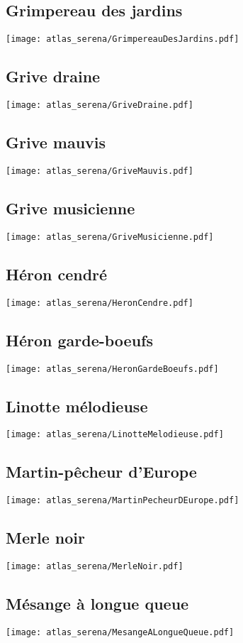 \subsection{Grimpereau des jardins}
\texttt{[image: atlas\_serena/GrimpereauDesJardins.pdf]}
\subsection{Grive draine}
\texttt{[image: atlas\_serena/GriveDraine.pdf]}
\subsection{Grive mauvis}
\texttt{[image: atlas\_serena/GriveMauvis.pdf]}
\subsection{Grive musicienne}
\texttt{[image: atlas\_serena/GriveMusicienne.pdf]}
\subsection{Héron cendré}
\texttt{[image: atlas\_serena/HeronCendre.pdf]}
\subsection{Héron garde-boeufs}
\texttt{[image: atlas\_serena/HeronGardeBoeufs.pdf]}
\subsection{Linotte mélodieuse}
\texttt{[image: atlas\_serena/LinotteMelodieuse.pdf]}
\subsection{Martin-pêcheur d'Europe}
\texttt{[image: atlas\_serena/MartinPecheurDEurope.pdf]}
\subsection{Merle noir}
\texttt{[image: atlas\_serena/MerleNoir.pdf]}
\subsection{Mésange à longue queue}
\texttt{[image: atlas\_serena/MesangeALongueQueue.pdf]}
